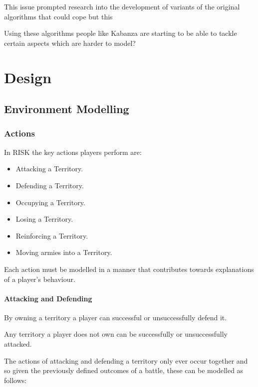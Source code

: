 \documentclass[parskip]{cs4rep}
\begin{document}
This issue prompted research into the development of variants of the original algorithms that could cope but this 

Using these algorithms people like Kabanza are starting to be able to tackle certain aspects which are harder to model?

\chapter{Design}

\section{Environment Modelling}

\subsection{Actions}

In RISK the key actions players perform are:

\begin{itemize}
\item
Attacking a Territory.
\item
Defending a Territory.
\item
Occupying a Territory.
\item
Losing a Territory.
\item
Reinforcing a Territory.
\item
Moving armies into a Territory.
\newline
\end{itemize}

Each action must be modelled in a manner that contributes towards explanations of a player's behaviour.

\subsubsection{Attacking and Defending}

By owning a territory a player can successful or unsuccessfully defend it. 

Any territory a player does not own can be successfully or unsuccessfully attacked.

The actions of attacking and defending a territory only ever occur together and so given the previously defined outcomes of a battle, these can be modelled as follows:
\end{document}
